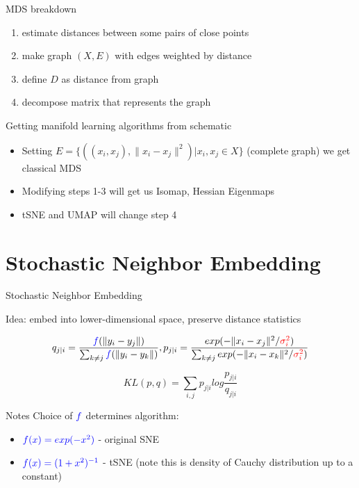 \documentclass[unknownkeysallowed]{beamer}
\begin{document}
\begin{frame}{MDS breakdown}


\begin{enumerate}
   \item estimate distances between some pairs of close points
   \item make graph $(X, E)$ with edges weighted by distance
   \item define $D$ as distance from graph
   \item decompose matrix that represents the graph
\end{enumerate}{}

\begin{block}{Getting manifold learning algorithms from schematic}

\begin{itemize}
    \item Setting $E = \{((x_i, x_j), \|x_i - x_j\|^2) | x_i, x_j \in X \}$ (complete graph) we get classical MDS
    \item Modifying steps 1-3 will get us Isomap, Hessian Eigenmaps
    \item tSNE and UMAP will change step 4
\end{itemize}
\end{block}



\end{frame}

\section{Stochastic Neighbor Embedding}
\begin{frame}{Stochastic Neighbor Embedding}

Idea: embed into lower-dimensional space, preserve distance statistics

$$q_{j|i} = \frac{\textcolor{blue}{f}(\|y_i - y_j\|)}{\sum_{k \neq j}\textcolor{blue}{f}(\|y_i - y_k\|)}, p_{j|i} = \frac{exp(-\|x_i - x_j\|^2 / \textcolor{red}{\sigma^2_i})}{\sum_{k \neq j}exp(-\|x_i - x_k\|^2/\textcolor{red}{\sigma^2_i})}$$

$$KL(p, q) = \sum_{i, j} p_{j|i} log\frac{p_{j|i}}{q_{j|i}}$$

\begin{block}{Notes}
Choice of $\textcolor{blue}{f}$ determines algorithm:
\begin{itemize}
    \item $\textcolor{blue}{f(x) = exp(-x^2)}$ - original SNE
    \item $\textcolor{blue}{f(x) = (1 + x^2)^{-1}}$ - tSNE (note this is density of Cauchy distribution up to a constant)
\end{itemize}
\end{block}
\end{frame}
\end{document}
